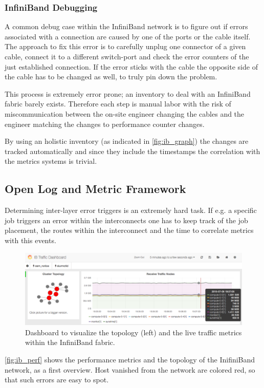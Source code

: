 \subsubsection{InfiniBand Debugging}
A common debug case within the InfiniBand network is to figure out if errors associated with a connection are caused by one of the ports or the cable itself.
The approach to fix this error is to carefully unplug one connector of a given cable, connect it to a different switch-port and check the error counters of the just established connection.
If the error sticks with the cable the opposite side of the cable has to be changed as well, to truly pin down the problem.

This process is extremely error prone; an inventory to deal with an InfiniBand fabric barely exists. Therefore each step is manual labor with the risk of miscommunication between the on-site engineer changing the
cables and the engineer matching the changes to performance counter changes.

By using an holistic inventory (as indicated in \autoref{fig:ib_graph}) the changes are tracked automatically and since they include the timestamps the correlation with the metrics systems is trivial.

\subsection{Open Log and Metric Framework}
Determining inter-layer error triggers is an extremely hard task. If e.g. a specific job triggers an error within the interconnects one has to keep track of the job placement, the routes within the interconnect and
the time to correlate metrics with this events.

\begin{figure}[!ht]
    \includegraphics[width=.4\textwidth]{images/png/ib_perf_s.png}
    \caption{\label{fig:ib_perf}Dashboard to visualize the topology (left) and the live traffic metrics within the InfiniBand fabric.}
\end{figure}
\autoref{fig:ib_perf} shows the performance metrics and the topology of the InifiniBand network, as a first overview. Host vanished from the network are colored red, so that such errors are easy to spot.

